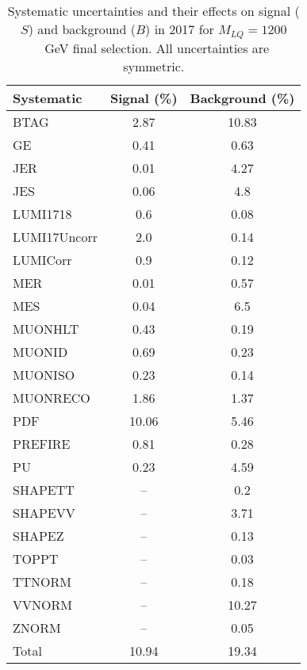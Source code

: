 \begin{table}[htbp]
\begin{center}
\caption{Systematic uncertainties and their effects on signal ($S$) and background ($B$) in 2017 for $M_{LQ}=1200$~GeV final selection. All uncertainties are symmetric.}
\begin{tabular}{lcc}
\hline\hline
Systematic & Signal (\%) & Background (\%) \\ \hline 
BTAG & 2.87 & 10.83\\ 
GE & 0.41 & 0.63\\ 
JER & 0.01 & 4.27\\ 
JES & 0.06 & 4.8\\ 
LUMI1718 & 0.6 & 0.08\\ 
LUMI17Uncorr & 2.0 & 0.14\\ 
LUMICorr & 0.9 & 0.12\\ 
MER & 0.01 & 0.57\\ 
MES & 0.04 & 6.5\\ 
MUONHLT & 0.43 & 0.19\\ 
MUONID & 0.69 & 0.23\\ 
MUONISO & 0.23 & 0.14\\ 
MUONRECO & 1.86 & 1.37\\ 
PDF & 10.06 & 5.46\\ 
PREFIRE & 0.81 & 0.28\\ 
PU & 0.23 & 4.59\\ 
SHAPETT & -- & 0.2\\ 
SHAPEVV & -- & 3.71\\ 
SHAPEZ & -- & 0.13\\ 
TOPPT & -- & 0.03\\ 
TTNORM & -- & 0.18\\ 
VVNORM & -- & 10.27\\ 
ZNORM & -- & 0.05\\ 
Total & 10.94 & 19.34\\ \hline \hline
\end{tabular}
\label{tab:SysUncertainties_uujj_1200}
\end{center}
\end{table}

